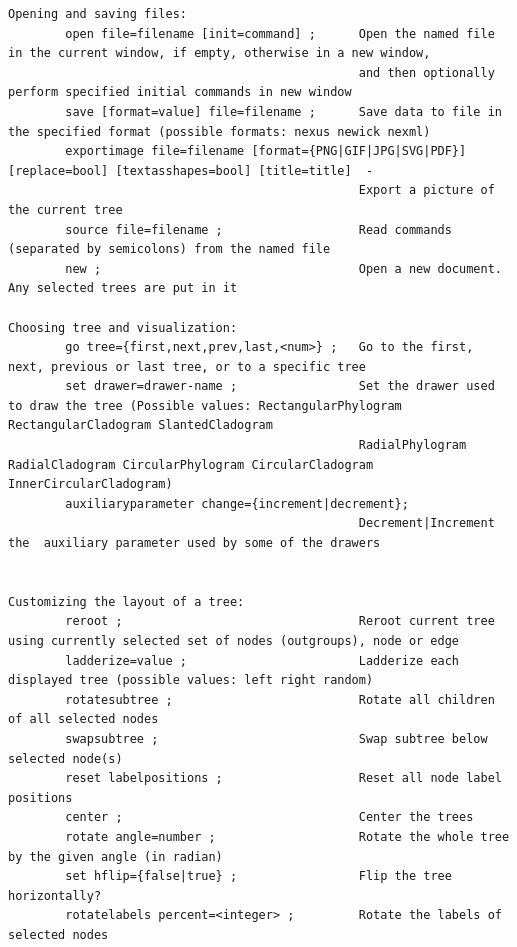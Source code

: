 \documentclass[11pt]{article}
\begin{document}
\tiny
\begin{verbatim}
Opening and saving files:
        open file=filename [init=command] ;      Open the named file in the current window, if empty, otherwise in a new window,
                                                 and then optionally perform specified initial commands in new window
        save [format=value] file=filename ;      Save data to file in the specified format (possible formats: nexus newick nexml)
        exportimage file=filename [format={PNG|GIF|JPG|SVG|PDF}] [replace=bool] [textasshapes=bool] [title=title]  -
                                                 Export a picture of the current tree
        source file=filename ;                   Read commands (separated by semicolons) from the named file 
        new ;                                    Open a new document. Any selected trees are put in it

Choosing tree and visualization:
        go tree={first,next,prev,last,<num>} ;   Go to the first, next, previous or last tree, or to a specific tree
        set drawer=drawer-name ;                 Set the drawer used to draw the tree (Possible values: RectangularPhylogram RectangularCladogram SlantedCladogram
                                                 RadialPhylogram RadialCladogram CircularPhylogram CircularCladogram InnerCircularCladogram)
        auxiliaryparameter change={increment|decrement}; 
                                                 Decrement|Increment the  auxiliary parameter used by some of the drawers


Customizing the layout of a tree:
        reroot ;                                 Reroot current tree using currently selected set of nodes (outgroups), node or edge
        ladderize=value ;                        Ladderize each displayed tree (possible values: left right random)
        rotatesubtree ;                          Rotate all children of all selected nodes
        swapsubtree ;                            Swap subtree below selected node(s)
        reset labelpositions ;                   Reset all node label positions
        center ;                                 Center the trees
        rotate angle=number ;                    Rotate the whole tree by the given angle (in radian)
        set hflip={false|true} ;                 Flip the tree horizontally?
        rotatelabels percent=<integer> ;         Rotate the labels of selected nodes


\end{verbatim}
\end{document}
